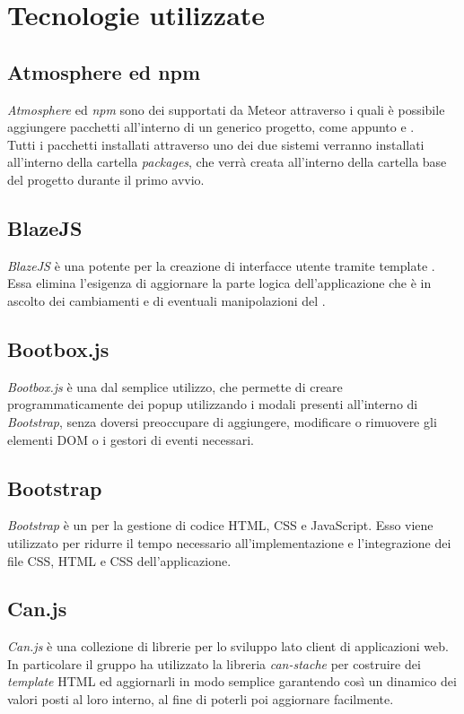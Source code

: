 \section{Tecnologie utilizzate}

\subsection{Atmosphere ed npm}
\textit{Atmosphere} ed \textit{npm} sono dei  supportati da Meteor attraverso i quali è possibile aggiungere pacchetti  all'interno di un generico progetto, come appunto  e . \\
Tutti i pacchetti installati attraverso uno dei due sistemi verranno installati all'interno della cartella \textit{packages}, che verrà creata all'interno della cartella base del progetto durante il primo avvio.

\subsection{BlazeJS}
\textit{BlazeJS} è una potente  per la creazione di interfacce utente tramite template . Essa elimina l'esigenza di aggiornare la parte logica dell'applicazione che è in ascolto dei cambiamenti e di eventuali manipolazioni del .

\subsection{Bootbox.js}
\textit{Bootbox.js} è una  dal semplice utilizzo, che permette di creare programmaticamente dei popup utilizzando i modali presenti all'interno di \textit{Bootstrap}, senza doversi preoccupare di aggiungere, modificare o rimuovere gli elementi DOM o i gestori di eventi  necessari.

\subsection{Bootstrap}
\textit{Bootstrap} è un  per la gestione di codice HTML, CSS e JavaScript. Esso viene utilizzato per ridurre il tempo necessario all'implementazione e l'integrazione dei file CSS, HTML e CSS dell'applicazione.

\subsection{Can.js}
\textit{Can.js} è una collezione di librerie per lo sviluppo lato client di applicazioni web. In particolare il gruppo ha utilizzato la libreria \textit{can-stache} per costruire dei \textit{template} HTML ed aggiornarli in modo semplice garantendo così un  dinamico dei valori posti al loro interno, al fine di poterli poi aggiornare facilmente.

